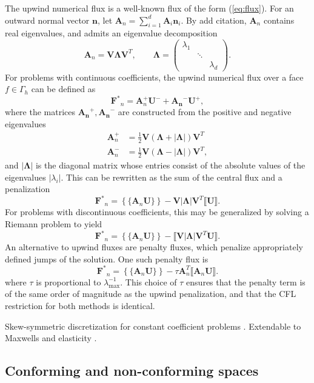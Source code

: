 \documentclass[10pt]{article}
\newcommand{\LRp}[1]{\left( #1 \right)}
\newcommand{\LRb}[1]{\left| #1 \right|}
\newcommand{\LRc}[1]{\left\{ #1 \right\}}
\newcommand{\jump}[1] {\ensuremath{\llbracket#1\rrbracket}}
\newcommand{\avg}[1] {\ensuremath{\LRc{\!\{#1\}\!}}}
\newcommand{\Gh}{\Gamma_h}
\newcommand{\note}[1]{{\color{blue}#1}}
\begin{document}
The upwind numerical flux is a well-known flux of the form (\ref{eq:flux}).  For an outward normal vector $\bm{n}$, let ${\bm{A}}_n = \sum_{i=1}^d {\bm{A}_i\bm{n}_i}$.  By \note{add citation}, ${\bm{A}}_n$ contains real eigenvalues, and admits an eigenvalue decomposition
\[
\bm{A}_n = \bm{V}{\bm{\Lambda}}\bm{V}^T, \qquad \bm{\Lambda} = 
\left(\begin{array}{ccc}
\lambda_1 & & \\
& \ddots & \\
& & \lambda_d
\end{array}\right).
\]
For problems with continuous coefficients, the upwind numerical flux over a face $f \in \Gh$ can be defined  as
\[
\bm{F^*}_n = \bm{A}_n^+\bm{U}^- + \bm{A_n}^- \bm{U}^+,
\]
where the matrices $\bm{A_n}^+,\bm{A_n}^-$ are constructed from the positive and negative eigenvalues 
\begin{align*}
\bm{A}_n^+ &= \frac{1}{2}\bm{V} \LRp{\bm{\Lambda} + \LRb{\bm{\Lambda}}} \bm{V}^T\\
\bm{A}_n^- &= \frac{1}{2}\bm{V} \LRp{\bm{\Lambda} - \LRb{\bm{\Lambda}}} \bm{V}^T,
\end{align*}
and $\LRb{\bm{\Lambda}}$ is the diagonal matrix whose entries consist of the absolute values of the eigenvalues $\LRb{\lambda_i}$.  This can be rewritten as the sum of the central flux and a penalization
\[
\bm{F^*}_n = \avg{\bm{A}_n\bm{U}} - \bm{V}\LRb{\bm{\Lambda}}\bm{V}^T \jump{\bm{U}}.  
\]
For problems with discontinuous coefficients, this may be generalized by solving a Riemann problem to yield
\[
\bm{F^*}_n = \avg{\bm{A}_n\bm{U}} - \jump{{\bm{V}\LRb{\bm{\Lambda}}\bm{V}^T\bm{U}}}.  
\]
An alternative to upwind fluxes are penalty fluxes, which penalize appropriately defined jumps of the solution.  One such penalty flux is 
\[
\bm{F^*}_n = \avg{\bm{A}_n\bm{U}} - \tau \bm{A}_n^T \jump{\bm{A}_n\bm{U}}.  
\]
where $\tau$ is proportional to $\lambda_{\max}^{-1}$.  This choice of $\tau$ ensures that the penalty term is of the same order of magnitude as the upwind penalization, and that the CFL restriction for both methods is identical.  

\note{Skew-symmetric discretization for constant coefficient problems \cite{kopriva2014energy}.  Extendable to Maxwells \cite{warburton2013low} and elasticity \cite{wilcox2010high,ye2016discontinuous}.}

\subsection{Conforming and non-conforming spaces}
\end{document}
